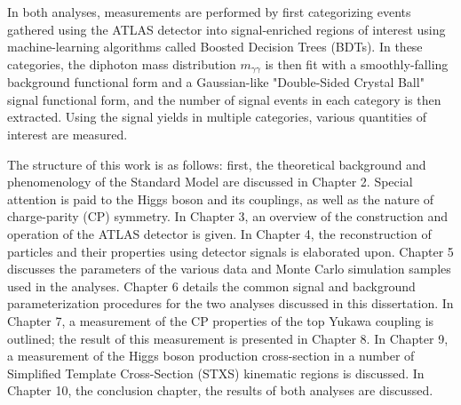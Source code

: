 In both analyses, measurements are performed by first categorizing events gathered using the ATLAS detector into signal-enriched regions of interest using machine-learning algorithms called Boosted Decision Trees (BDTs). In these categories, the diphoton mass distribution $m_{\gamma \gamma}$ is then fit with a smoothly-falling background functional form and a Gaussian-like "Double-Sided Crystal Ball" signal functional form, and the number of signal events in each category is then extracted. Using the signal yields in multiple categories, various quantities of interest are measured.

The structure of this work is as follows: first, the theoretical background and phenomenology of the Standard Model are discussed in Chapter 2. Special attention is paid to the Higgs boson and its couplings, as well as the nature of charge-parity (CP) symmetry. In Chapter 3, an overview of the construction and operation of the ATLAS detector is given. In Chapter 4, the reconstruction of particles and their properties using detector signals is elaborated upon. Chapter 5 discusses the parameters of the various data and Monte Carlo simulation samples used in the analyses. Chapter 6 details the common signal and background parameterization procedures for the two analyses discussed in this dissertation. In Chapter 7, a measurement of the CP properties of the top Yukawa coupling is outlined; the result of this measurement is presented in Chapter 8. In Chapter 9, a measurement of the Higgs boson production cross-section in a number of Simplified Template Cross-Section (STXS) kinematic regions is discussed. In Chapter 10, the conclusion chapter, the results of both analyses are discussed.